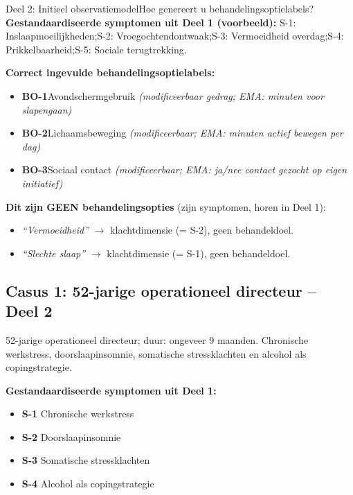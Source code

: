 \documentclass[11pt,a4paper]{article}
\begin{document}
\begin{voorbeeldbox}{Deel 2: Initieel observatiemodel}{Hoe genereert u behandelingsoptielabels?}
\small
\textbf{Gestandaardiseerde symptomen uit Deel 1 (voorbeeld):}
S-1: Inslaapmoeilijkheden;\enspace S-2: Vroegochtendontwaak;\enspace S-3: Vermoeidheid overdag;\enspace S-4: Prikkelbaarheid;\enspace S-5: Sociale terugtrekking.

\medskip
\textbf{Correct ingevulde behandelingsoptielabels:}
\begin{itemize}[topsep=2pt,itemsep=1pt]
\item \textbf{BO-1}\enspace Avondschermgebruik
  \hfill\textit{(modificeerbaar gedrag; EMA: minuten voor slapengaan)}
\item \textbf{BO-2}\enspace Lichaamsbeweging
  \hfill\textit{(modificeerbaar; EMA: minuten actief bewegen per dag)}
\item \textbf{BO-3}\enspace Sociaal contact
  \hfill\textit{(modificeerbaar; EMA: ja/nee contact gezocht op eigen initiatief)}
\end{itemize}

\medskip
\textbf{\color{StrongRed}Dit zijn GEEN behandelingsopties} (zijn symptomen, horen in Deel 1):
\begin{itemize}[topsep=1pt,itemsep=0pt]
\item \textit{``Vermoeidheid''} $\rightarrow$ klachtdimensie (= S-2), geen behandeldoel.
\item \textit{``Slechte slaap''} $\rightarrow$ klachtdimensie (= S-1), geen behandeldoel.
\end{itemize}
\end{voorbeeldbox}

\vspace{0.5em}

\newpage
\subsection*{Casus 1: 52-jarige operationeel directeur -- Deel 2}

\begin{complaintbox}[title={Casus 1: verkorte klachtomschrijving}]
\small 52-jarige operationeel directeur; duur: ongeveer 9 maanden. Chronische werkstress, doorslaapinsomnie, somatische stressklachten en alcohol als copingstrategie.
\end{complaintbox}

\begin{contextbox}
\small\textbf{Gestandaardiseerde symptomen uit Deel 1:}
\begin{itemize}[topsep=2pt,itemsep=1pt]
\item \textbf{S-1} Chronische werkstress
\item \textbf{S-2} Doorslaapinsomnie
\item \textbf{S-3} Somatische stressklachten
\item \textbf{S-4} Alcohol als copingstrategie
\end{itemize}
\end{contextbox}
\end{document}
